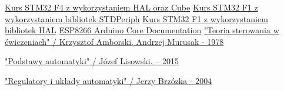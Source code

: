\documentclass[10pt, a4paper]{article}
\begin{document}
\newpage
%
%
\begin{thebibliography}{9}
	
	\href{https://forbot.pl/blog/kurs-stm32-f4-1-czas-poznac-hal-spis-tresci-kursu-id14114}{Kurs STM32 F4 z wykorzystaniem HAL oraz Cube}
	\href{https://forbot.pl/blog/stm32-praktyce-1-platforma-srodowisko-id2733}{Kurs STM32 F1 z wykorzystaniem bibliotek STDPeriph}
	\href{https://forbot.pl/blog/kurs-stm32-f1-migracja-na-hal-wstep-spis-tresci-id23580} {Kurs STM32 F1 z wykorzystaniem bibliotek HAL}
	\href{https://media.readthedocs.org/pdf/arduino-esp8266/docs_to_readthedocs/arduino-esp8266.pdf} {ESP8266 Arduino Core Documentation}
	\href{https://docer.pl/doc/n5xcex8} { "Teoria sterowania w ćwiczeniach" / Krzysztof Amborski, Andrzej Murusak - 1978}
	
	\href{http://hps.biblos.pk.edu.pl/ST/2016/09/100000294850/100000294850_Lisowski_PodstawyAutomatyki.pdf} {"Podstawy automatyki" / Józef Lisowski. – 2015}
	
	\href{http://www.ksiegarniasuplement.pl/ksiazka/Brzozka-Jerzy/Regulatory-i-uklady-automatyki,36961901633KS} {"Regulatory i układy automatyki" / Jerzy Brzózka - 2004}
	
\end{thebibliography}
\end{document}
